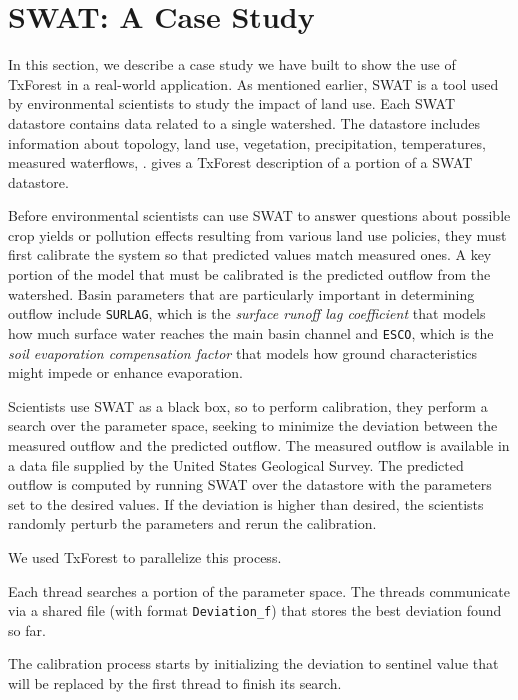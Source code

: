 \section{SWAT: A Case Study}
\label{sec:swat}
In this section, we describe a case study we have built to show the
use of TxForest in a real-world application.  As mentioned earlier,
SWAT is a tool used by environmental scientists to study the impact of
land use.  Each SWAT datastore contains data related to a single
watershed.  The datastore includes information about topology, land
use, vegetation, precipitation, temperatures, measured waterflows,
\etc{}.   gives a TxForest description of
a portion of a SWAT datastore.  

Before environmental scientists can use SWAT to answer questions about
possible crop yields or pollution effects resulting from various land
use policies, they must first calibrate the system so that predicted
values match measured ones.  A key portion of the model that must be
calibrated is the predicted outflow from the watershed.  Basin
parameters that are particularly important in determining outflow
include \texttt{SURLAG}, which is the 
 \textit{surface runoff lag coefficient} that models how much surface
 water reaches the main basin channel 
and \texttt{ESCO}, which is the 
 \textit{soil evaporation compensation factor} that models how ground
 characteristics might impede or enhance evaporation.

Scientists use SWAT as a black box, so to perform calibration, they
perform a search over the parameter space, seeking to minimize the
deviation between the measured outflow and the predicted outflow.
The measured outflow is available in a data file supplied by the
United States Geological Survey.  The predicted outflow is computed by
running SWAT over the datastore with the parameters set to the desired
values.  If the deviation is higher than desired, the scientists
randomly perturb the parameters and rerun the calibration.  

We used TxForest to parallelize this process.  


Each thread searches a
portion of the parameter space.  The threads communicate via a shared file
(with format \texttt{Deviation\_f}) that stores the best deviation
found so far.   

The calibration process starts by initializing the deviation to 
sentinel value that will be replaced by the first thread to finish its
search. 

